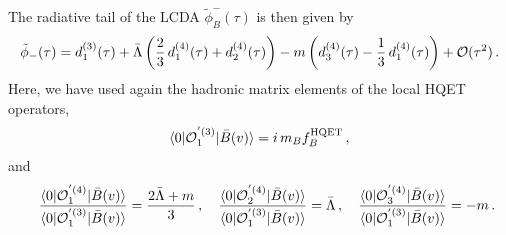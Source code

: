 \documentclass[a4paper,11pt]{article}
\begin{document}
The radiative tail of the LCDA $\tilde \phi_B^-(\tau)$ is then given by 
\begin{eqnarray}
	\tilde\phi_-(\tau) =
    d_1^{(3)}(\tau)
    + \bar \Lambda \left(
        \frac23 \, d_1^{(4)}(\tau)
        + d_2^{(4)}(\tau)
    \right)
	- m \left(
         d_3^{(4)}(\tau)
         - \frac13 \, d_1^{(4)}(\tau)
     \right)
     + {\cal O}(\tau^2) \,.
 \label{phiexp2}
\end{eqnarray}
Here, we have used again the hadronic matrix elements of the local HQET
operators,
\begin{eqnarray}
	\langle 0| {\cal O}_1^{'(3)} | \bar{B}(v)\rangle 
	= i \, m_B f_B^{\rm HQET}  \,,
\end{eqnarray}
and
\begin{eqnarray}
&&	\frac{\langle 0| {\cal O}_1^{'(4)} |\bar{B}(v)\rangle}{\langle 0| {\cal O}_1^{'(3)} | \bar{B}(v)\rangle} = \frac{2\bar\Lambda + m}{3} \,, 
	\quad 
	\frac{\langle 0| {\cal O}_2^{'(4)} |\bar{B}(v)\rangle}{\langle 0| {\cal O}_1^{'(3)} | \bar{B}(v)\rangle} = \bar\Lambda \,,
	\quad
	\frac{\langle 0| {\cal O}_3^{'(4)} |\bar{B}(v)\rangle}{\langle 0| {\cal O}_1^{'(3)} | \bar{B}(v)\rangle} = -  m \,.
\end{eqnarray} 
\end{document}
